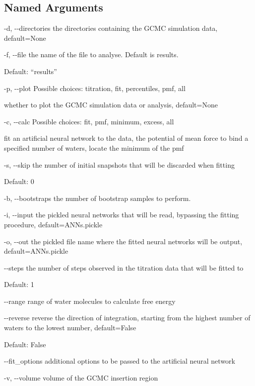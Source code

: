 \documentclass[letterpaper,10pt,english]{sphinxmanual}
\begin{document}
\subsection{Named Arguments}
\label{\detokenize{tools:Named Arguments}}\begin{optionlist}{3cm}
\item [-d, -{-}directories]  
the directories containing the GCMC simulation data, default=None
\item [-f, -{-}file]  
the name of the file to analyse. Default is results.

Default: “results”
\item [-p, -{-}plot]  
Possible choices: titration, fit, percentiles, pmf, all

whether to plot the GCMC simulation data or analysis, default=None
\item [-c, -{-}calc]  
Possible choices: fit, pmf, minimum, excess, all

fit an artificial neural network to the data, the potential of mean force to bind a specified number of waters, locate the minimum of the pmf
\item [-s, -{-}skip]  
the number of initial snapshots that will be discarded when fitting

Default: 0
\item [-b, -{-}bootstraps]  
the number of bootstrap samples to perform.
\item [-i, -{-}input]  
the pickled neural networks that will be read, bypassing the fitting procedure, default=ANNs.pickle
\item [-o, -{-}out]  
the pickled file name where the fitted neural networks will be output, default=ANNs.pickle
\item [-{-}steps]  
the number of steps observed in the titration data that will be fitted to

Default: 1
\item [-{-}range]  
range of water molecules to calculate free energy
\item [-{-}reverse]  
reverse the direction of integration, starting from the highest number of waters to the lowest number, default=False

Default: False
\item [-{-}fit\_options]  
additional options to be passed to the artificial neural network
\item [-v, -{-}volume]  
volume of the GCMC insertion region
\end{optionlist}
\end{document}

